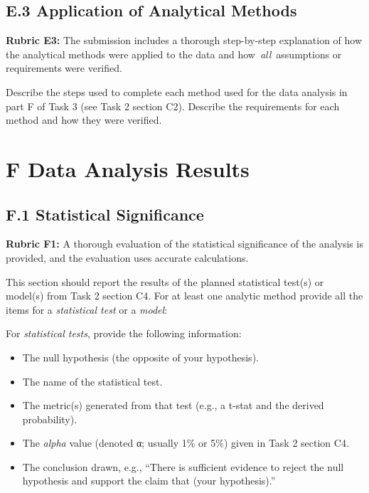 \hypertarget{e.3-application-of-analytical-methods}{%
\subsection{\texorpdfstring{E.3 Application of Analytical Methods
}{E.3 Application of Analytical Methods }}\label{e.3-application-of-analytical-methods}}

\textbf{Rubric E3:} The submission includes a thorough step-by-step
explanation of how the analytical methods were applied to the data and
how~\emph{all}~assumptions or requirements were verified.

Describe the steps used to complete each method used for the data
analysis in part F of Task 3 (see Task 2 section C2). Describe the
requirements for each method and how they were verified.

\hypertarget{f-data-analysis-results}{%
\section{\texorpdfstring{F Data Analysis Results
}{F Data Analysis Results }}\label{f-data-analysis-results}}

\hypertarget{f.1-statistical-significance}{%
\subsection{F.1 Statistical
Significance}\label{f.1-statistical-significance}}

\textbf{Rubric F1:} A thorough evaluation of the statistical
significance of the analysis is provided, and the evaluation uses
accurate calculations.

This section should report the results of the planned statistical
test(s) or model(s) from Task 2 section C4. For at least one analytic
method provide all the items for a \emph{statistical test} or a
\emph{model}:

For \emph{statistical tests}, provide the following information:~

\begin{itemize}
\item
  The null hypothesis (the opposite of your hypothesis).~
\item
  The name of the statistical test.~
\end{itemize}

\begin{itemize}
\item
  The metric(s) generated from that test (e.g., a t-stat and the derived
  probability).~
\item
  The \emph{alpha} value (denoted α; usually 1\% or 5\%) given in Task 2
  section C4.
\item
  The conclusion drawn, e.g., ``There is sufficient evidence to reject
  the null hypothesis and support the claim that (your hypothesis).''~~
\end{itemize}

